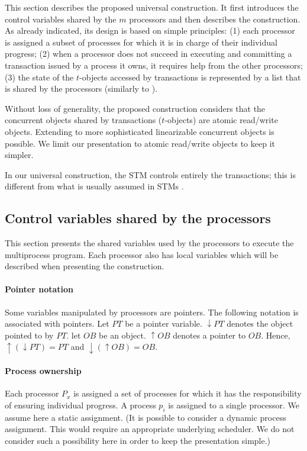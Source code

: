 This section describes the proposed universal construction. 
It first introduces  the control variables shared by the $m$ processors
and then describes the  construction. As already indicated, its 
design is based on simple principles: 
(1) each processor is assigned a subset of processes for which 
it is in charge  of  their individual progress; 
(2) when  a  processor does not succeed in executing and committing  
a transaction issued by a process it owns,  it requires help from the other
processors;  
(3) the state of the $t$-objects accessed by transactions is represented 
by a list that is shared by the processors (similarly to \cite{H91}). 



Without loss of generality, the proposed construction considers that 
the  concurrent objects  shared  by transactions ($t$-objects) are  atomic
read/write objects. Extending to more sophisticated linearizable 
concurrent objects is possible. We limit our presentation to atomic
read/write objects to keep it  simpler. 


In our universal construction, the STM controls entirely the transactions; this is different from 
what is usually assumed in STMs \cite{GK10}.



\subsection{Control variables shared  by the  processors}

This section  presents  the shared  variables used by  
the processors to execute the multiprocess program. 
Each processor also has local variables which will be described when presenting 
the  construction.   

\paragraph{Pointer notation} 
Some  variables  manipulated  by  processors are  pointers.  The  following
notation is associated with pointers. Let  $PT$   be a pointer variable.  
$\downarrow PT$ denotes the object pointed to by $PT$. let 
$OB$ be an object. $\uparrow OB$ denotes a  pointer to $OB$. 
Hence, $\uparrow (\downarrow PT) =PT$ and  $ \downarrow (\uparrow OB) = OB$.  





\paragraph{Process ownership}
Each processor $P_x$  is assigned a set of processes for which it has the
responsibility of ensuring individual progress. A process $p_i$ is 
assigned to a single processor.  We assume here a static  assignment. 
(It is possible to consider a dynamic process assignment. This would 
require an appropriate underlying scheduler. We do not consider  
such a possibility  here in order to keep the presentation simple.)

